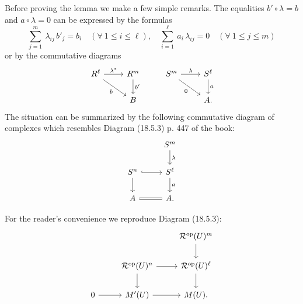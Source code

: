 \documentclass[12pt]{article}%
\theoremstyle{remark}
\theoremstyle{definition}
\newcommand{\cc}{\mathcal}
\DeclareMathOperator{\op}{op}
\begin{document}
Before proving the lemma we make a few simple remarks. The equalities $b'\circ\lambda=b$ and $a\circ\lambda=0$ can be expressed by the formulas
%
\begin{equation}\label{lij}
\sum_{j=1}^m\ \lambda_{ij}\,b'_j=b_i\quad(\forall\ 1\le i\le\ell),\quad
\sum_{i=1}^\ell\ a_i\,\lambda_{ij}=0\quad(\forall\ 1\le j\le m)
\end{equation}
%
or by the commutative diagrams
$$
\begin{tikzcd}
R^\ell\ar{r}{\lambda^*}\ar{rd}[swap]{b}&R^m\ar{d}{b'}&
S^m\ar{r}{\lambda}\ar{rd}[swap]{0}&S^\ell\ar{d}{a}
\\ 
{}&B&{}&A.
\end{tikzcd}
$$ 
The situation can be summarized by the following commutative diagram of complexes which resembles Diagram (18.5.3) p. 447 of the book:
%
\begin{equation}\label{dt=0}
\begin{tikzcd}
{}&S^m\ar{d}{\lambda}\\ 
S^n\ar[hook]{r}\ar{d}&S^\ell\ar{d}{a}\\ 
A\ar[equal]{r}&A.
\end{tikzcd}
\end{equation}

For the reader's convenience we reproduce Diagram (18.5.3): 
$$
\begin{tikzcd}
{}&{}&\cc R^{\op}(U)^m\ar{d}\\ 
{}&\cc R^{\op}(U)^n\ar{d}\ar{r}&\cc R^{\op}(U)^\ell\ar{d}\\ 
0\ar{r}&M'(U)\ar{r}&M(U).
\end{tikzcd}
$$
\end{document}
